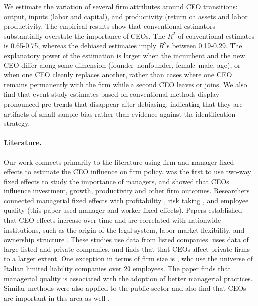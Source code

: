 \documentclass[sigconf,nonacm]{acmart}
\begin{document}
We estimate the variation of several firm attributes around CEO transitions:  output, inputs (labor and capital), and productivity (return on assets and labor productivity. The empirical results show that conventional estimators substantially overstate the importance of CEOs. The $R^2$ of conventional estimates is 0.65-0.75, whereas the debiased estimates imply $R^2$s between 0.19-0.29. The explanatory power of the estimation is larger when the incumbent and the new CEO differ along some dimension (founder–nonfounder, female–male, age), or when one CEO cleanly replaces another, rather than cases where one CEO remains permanently with the firm while a second CEO leaves or joins. We also find that event-study estimates based on conventional methods display pronounced pre-trends that disappear after debiasing, indicating that they are artifacts of small-sample bias rather than evidence against the identification strategy. 

\paragraph{Literature.} Our work connects primarily to the literature using firm and manager fixed effects to estimate the CEO influence on firm policy. \cite{Bertrand2003-io} was the first to use two-way fixed effects to study the importance of managers, and showed that CEOs influence investment, growth, productivity and other firm outcomes. Researchers connected managerial fixed effects with profitability \citep{mackey2008effect}, risk taking \cite{schoar2024effect}, and employee quality \citep{lazear2015value} (this paper used manager and worker fixed effects). Papers established that CEO effects increase over time \citep{quigley2015has} and are correlated with nationwide institutions, such as the origin of the legal system, labor market flexibility, and ownership structure \citep{crossland2011differences}. These studies use data from listed companies. \cite{quigley2022ceo} uses data of large listed and private companies, and finds that that CEOs affect private firms to a larger extent. One exception in terms of firm size is \cite{baltrunaite2023managerial}, who use the universe of Italian limited liability companies over 20 employees. The paper finds that managerial quality is associated with the adoption of better managerial practices.  Similar methods were also applied to the public sector and also find that CEOs are important in this area as well \citep{fenizia2022managers, janke2024role}. 
\end{document}

